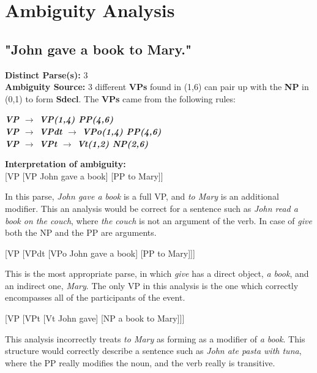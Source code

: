 \documentclass{article}
\begin{document}


\section{Ambiguity Analysis}

\subsection{"John gave a book to Mary."}

\textbf{Distinct Parse(s):} 3\\

\textbf{Ambiguity Source:} 3 different \textbf{VPs} found in (1,6) can pair up with the \textbf{NP} in (0,1) to form \textbf{Sdecl}. The \textbf{VPs} came from the following rules:

\begin{center}
	\textbf{\emph{VP $\rightarrow$ VP(1,4) PP(4,6)}\\
	\emph{VP $\rightarrow$ VPdt $\rightarrow$ VPo(1,4) PP(4,6)}\\
	\emph{VP $\rightarrow$ VPt $\rightarrow$ Vt(1,2) NP(2,6)}}
\end{center}

\textbf{Interpretation of ambiguity:}\\
{[}VP {[}VP John gave a book{]} {[}PP to Mary{]}{]}

In this parse, \emph{John gave a book} is a full VP, and \emph{to Mary} is an additional modifier. This an analysis would be correct for a sentence such as \emph{John read a book on the couch}, where \emph{the couch} is not an argument of the verb. In case of \emph{give} both the NP and the PP are arguments.

[VP [VPdt [VPo John gave a book] [PP to Mary]]]

This is the most appropriate parse, in which \emph{give} has a direct object, \emph{a book}, and an indirect one, \emph{Mary}. The only VP in this analysis is the one which correctly encompasses all of the participants of the event.

[VP [VPt [Vt John gave] [NP a book to Mary]]]

This analysis incorrectly treats \emph{to Mary} as forming as a modifier of \emph{a book}. This structure would correctly describe a sentence such as \emph{John ate pasta with tuna}, where the PP really modifies the noun, and the verb really is transitive.
\end{document}
